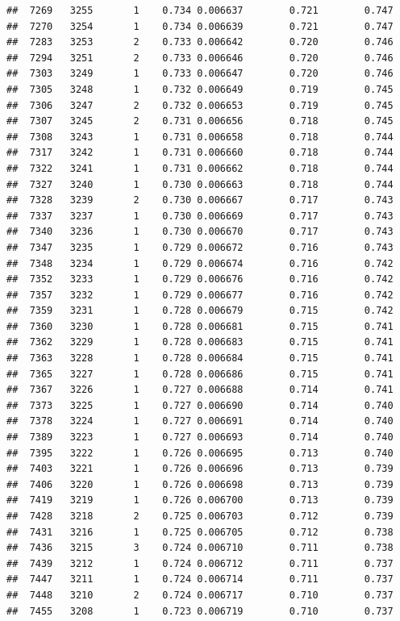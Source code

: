 \documentclass[
]{book}
\begin{document}
\begin{verbatim}
##  7269   3255       1    0.734 0.006637        0.721        0.747
##  7270   3254       1    0.734 0.006639        0.721        0.747
##  7283   3253       2    0.733 0.006642        0.720        0.746
##  7294   3251       2    0.733 0.006646        0.720        0.746
##  7303   3249       1    0.733 0.006647        0.720        0.746
##  7305   3248       1    0.732 0.006649        0.719        0.745
##  7306   3247       2    0.732 0.006653        0.719        0.745
##  7307   3245       2    0.731 0.006656        0.718        0.745
##  7308   3243       1    0.731 0.006658        0.718        0.744
##  7317   3242       1    0.731 0.006660        0.718        0.744
##  7322   3241       1    0.731 0.006662        0.718        0.744
##  7327   3240       1    0.730 0.006663        0.718        0.744
##  7328   3239       2    0.730 0.006667        0.717        0.743
##  7337   3237       1    0.730 0.006669        0.717        0.743
##  7340   3236       1    0.730 0.006670        0.717        0.743
##  7347   3235       1    0.729 0.006672        0.716        0.743
##  7348   3234       1    0.729 0.006674        0.716        0.742
##  7352   3233       1    0.729 0.006676        0.716        0.742
##  7357   3232       1    0.729 0.006677        0.716        0.742
##  7359   3231       1    0.728 0.006679        0.715        0.742
##  7360   3230       1    0.728 0.006681        0.715        0.741
##  7362   3229       1    0.728 0.006683        0.715        0.741
##  7363   3228       1    0.728 0.006684        0.715        0.741
##  7365   3227       1    0.728 0.006686        0.715        0.741
##  7367   3226       1    0.727 0.006688        0.714        0.741
##  7373   3225       1    0.727 0.006690        0.714        0.740
##  7378   3224       1    0.727 0.006691        0.714        0.740
##  7389   3223       1    0.727 0.006693        0.714        0.740
##  7395   3222       1    0.726 0.006695        0.713        0.740
##  7403   3221       1    0.726 0.006696        0.713        0.739
##  7406   3220       1    0.726 0.006698        0.713        0.739
##  7419   3219       1    0.726 0.006700        0.713        0.739
##  7428   3218       2    0.725 0.006703        0.712        0.739
##  7431   3216       1    0.725 0.006705        0.712        0.738
##  7436   3215       3    0.724 0.006710        0.711        0.738
##  7439   3212       1    0.724 0.006712        0.711        0.737
##  7447   3211       1    0.724 0.006714        0.711        0.737
##  7448   3210       2    0.724 0.006717        0.710        0.737
##  7455   3208       1    0.723 0.006719        0.710        0.737

\end{verbatim}
\end{document}
